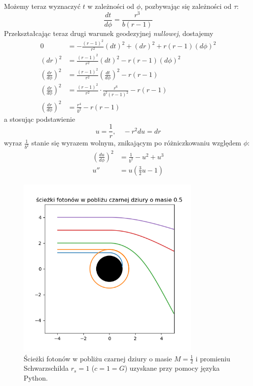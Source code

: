 Możemy teraz wyznaczyć $t$ w zależności od $\phi$, pozbywając się zależności od $\tau$:
$$\frac{dt}{d\phi}=\frac{r^3}{b(r-1)}$$
Przekształcając teraz drugi warunek geodezyjnej \emph{nullowej}, dostajemy
\begin{align*}
  0&=-\frac{(r-1)^2}{r^2}(dt)^2+(dr)^2+r(r-1)(d\phi)^2\\ 
  (dr)^2&=\frac{(r-1)^2}{r^2}(dt)^2-r(r-1)(d\phi)^2\\ 
  \left(\frac{dr}{d\phi}\right)^2&=\frac{(r-1)^2}{r^2}\left(\frac{dt}{d\phi}\right)^2-r(r-1)\\ 
  \left(\frac{dr}{d\phi}\right)^2&=\frac{(r-1)^2}{r^2}\cdot\frac{r^6}{b^2(r-1)^2}-r(r-1)\\ 
  \left(\frac{dr}{d\phi}\right)^2&=\frac{r^4}{b^2}-r(r-1)
\end{align*}
a stosując podstawienie 
$$u=\frac{1}{r},\quad -r^2du=dr$$
wyraz $\frac{1}{b^2}$ stanie się wyrazem wolnym, znikającym po różniczkowaniu względem $\phi$:
\begin{align}
  \left(\frac{du}{d\phi}\right)^2&=\frac{1}{b^2}-u^2+u^3\label{rownanie_orbity}\\ 
  u'' &=u\left(\frac{3}{2}u-1\right)\label{zmiana predkosci}
\end{align}

\renewcommand{\figurename}{Wykres}
\begin{figure}[h]
  \centering
  \includegraphics[width=0.8\textwidth]{ilustracje/sceizki_wykres.png}
  \caption{Ścieżki fotonów w pobliżu czarnej dziury o masie $M=\frac{1}{2}$ i promieniu Schwarzschilda $r_s=1$ ($c=1=G$) uzyskane przy pomocy języka Python.}\label{wykres fotonow}
\end{figure}

